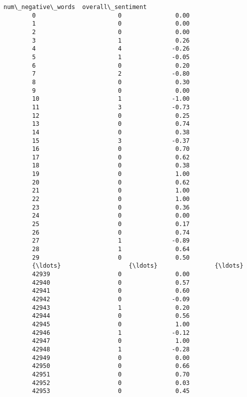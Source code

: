\documentclass[11pt]{article}
\begin{document}
\begin{Verbatim}[commandchars=\\\{\}]
               num\_negative\_words  overall\_sentiment  
        0                       0               0.00  
        1                       0               0.00  
        2                       0               0.00  
        3                       1               0.26  
        4                       4              -0.26  
        5                       1              -0.05  
        6                       0               0.20  
        7                       2              -0.80  
        8                       0               0.30  
        9                       0               0.00  
        10                      1              -1.00  
        11                      3              -0.73  
        12                      0               0.25  
        13                      0               0.74  
        14                      0               0.38  
        15                      3              -0.37  
        16                      0               0.70  
        17                      0               0.62  
        18                      0               0.38  
        19                      0               1.00  
        20                      0               0.62  
        21                      0               1.00  
        22                      0               1.00  
        23                      0               0.36  
        24                      0               0.00  
        25                      0               0.17  
        26                      0               0.74  
        27                      1              -0.89  
        28                      1               0.64  
        29                      0               0.50  
        {\ldots}                   {\ldots}                {\ldots}  
        42939                   0               0.00  
        42940                   0               0.57  
        42941                   0               0.60  
        42942                   0              -0.09  
        42943                   1               0.20  
        42944                   0               0.56  
        42945                   0               1.00  
        42946                   1              -0.12  
        42947                   0               1.00  
        42948                   1              -0.28  
        42949                   0               0.00  
        42950                   0               0.66  
        42951                   0               0.70  
        42952                   0               0.03  
        42953                   0               0.45  

\end{Verbatim}
\end{document}
